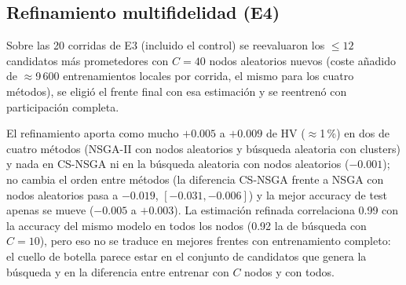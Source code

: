 \documentclass[11pt,a4paper]{article}
\begin{document}
\subsection{Refinamiento multifidelidad (E4)}
Sobre las 20 corridas de E3 (incluido el control) se reevaluaron los $\le12$ candidatos más prometedores con $C=40$ nodos aleatorios nuevos (coste añadido de $\approx$9\,600 entrenamientos locales por corrida, el mismo para los cuatro métodos), se eligió el frente final con esa estimación y se reentrenó con participación completa.

El refinamiento aporta como mucho $+0.005$ a $+0.009$ de HV ($\approx$1\,\%) en dos de cuatro métodos (NSGA-II con nodos aleatorios y búsqueda aleatoria con clusters) y nada en CS-NSGA ni en la búsqueda aleatoria con nodos aleatorios ($-0.001$); no cambia el orden entre métodos (la diferencia CS-NSGA frente a NSGA con nodos aleatorios pasa a $-0.019$, $[-0.031,-0.006]$) y la mejor accuracy de test apenas se mueve ($-0.005$ a $+0.003$). La estimación refinada correlaciona 0.99 con la accuracy del mismo modelo en todos los nodos (0.92 la de búsqueda con $C=10$), pero eso no se traduce en mejores frentes con entrenamiento completo: el cuello de botella parece estar en el conjunto de candidatos que genera la búsqueda y en la diferencia entre entrenar con $C$ nodos y con todos.
\end{document}
